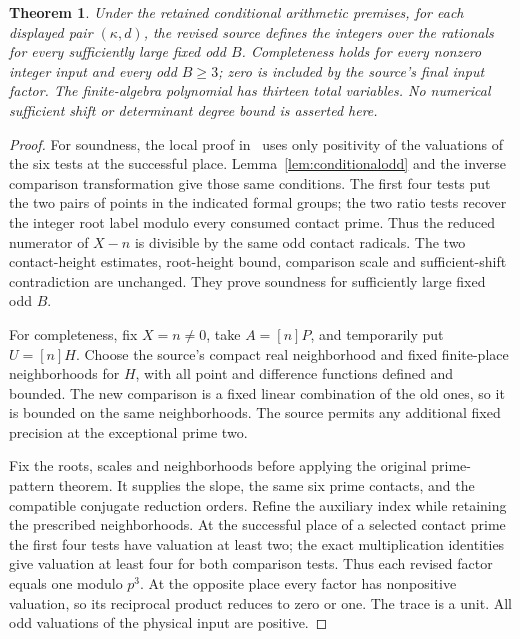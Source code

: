 \documentclass[11pt,a4paper]{article}
\newtheorem{theorem}{Theorem}[section]
\begin{document}
\begin{theorem}\label{thm:conditionalsource}
Under the retained conditional arithmetic premises, for each displayed
pair $(\kappa,d)$, the revised source defines the integers over the
rationals for every sufficiently large fixed odd $B$. Completeness
holds for every nonzero integer input and every odd $B\ge3$; zero
is included by the source's final input factor. The finite-algebra
polynomial has thirteen total variables. No numerical sufficient
shift or determinant degree bound is asserted here.
\end{theorem}
\begin{proof}
For soundness, the local proof in~\cite[Section 4]{Conditional} uses
only positivity of the valuations of the six tests at the successful
place. Lemma~\ref{lem:conditionalodd} and the inverse comparison
transformation give those same conditions. The first four tests put
the two pairs of points in the indicated formal groups; the two ratio
tests recover the integer root label modulo every consumed contact
prime. Thus the reduced numerator of $X-n$ is divisible by the same
odd contact radicals. The two contact-height estimates, root-height
bound, comparison scale and sufficient-shift contradiction are unchanged.
They prove soundness for sufficiently large fixed odd $B$.

For completeness, fix $X=n\ne0$, take $A=[n]P$, and temporarily
put $U=[n]H$. Choose the source's compact real neighborhood and fixed
finite-place neighborhoods for $H$, with all point and difference
functions defined and bounded. The new comparison is a fixed linear
combination of the old ones, so it is bounded on the same neighborhoods.
The source permits any additional fixed precision at the exceptional
prime two.

Fix the roots, scales and neighborhoods before applying the original
prime-pattern theorem. It supplies the slope, the same six prime contacts,
and the compatible conjugate reduction orders. Refine the auxiliary
index while retaining the prescribed neighborhoods. At the successful
place of a selected contact prime the first four tests have valuation
at least two; the exact multiplication identities give valuation at
least four for both comparison tests. Thus each revised factor equals
one modulo $p^3$. At the opposite place every factor has nonpositive
valuation, so its reciprocal product reduces to zero or one. The trace
is a unit. All odd valuations of the physical input are positive.


\end{proof}
\end{document}
